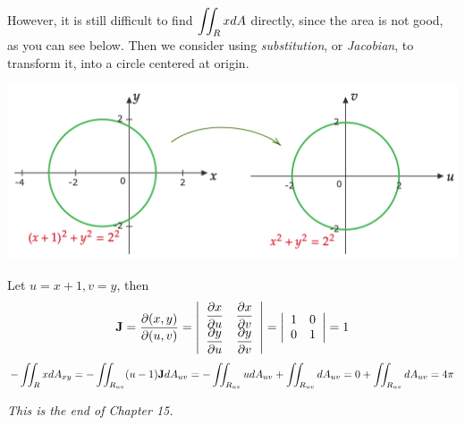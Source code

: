 \documentclass[11pt, a4paper]{MATH2023}
\newcommand{\pt}{\partial}
\begin{document}
\begin{spacing}{1.3}
    However, it is still difficult to find $\displaystyle \iint_R x dA$ directly, since the 
    area is not good, as you can see below. Then we consider using {\it substitution},
    or {\it Jacobian}, to transform it, into a circle centered at origin.
    \begin{center}
        \includegraphics[scale=0.4]{images/Ch15-ex6.2.png}
    \end{center}
    Let $u=x+1, v=y$, then
    $${\bf J}=\frac{\pt (x,y)}{\pt (u,v)}=
    \left|\begin{array}{cc}
        \dfrac{\pt x}{\pt u} & \dfrac{\pt x}{\pt v}\\
        \dfrac{\pt y}{\pt u} & \dfrac{\pt y}{\pt v}
    \end{array} \right|=\left|\begin{array}{cc}
        1 & 0 \\ 0 & 1
    \end{array} \right| = 1$$
    $$-\iint_R x dA_{xy}=-\iint_{R_{uv}} (u-1) {\bf J} dA_{uv}=
    -\iint_{R_{uv}}u dA_{uv} + \iint_{R_{uv}}dA_{uv}= 0+
    \iint_{R_{uv}}dA_{uv}=4\pi$$

    \vspace{\fill}
    \begin{center}
        {\it This is the end of Chapter 15.}
    \end{center}

\end{spacing}
\end{document}
